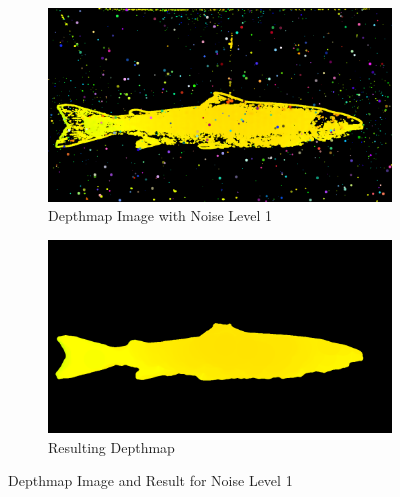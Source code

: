 \begin{figure}[H]
    \centering
    \begin{subfigure}{0.5\textwidth}
        \centering
        \includegraphics[width=.95\linewidth]{images/results/noise/noise63_1}
        \caption{Depthmap Image with Noise Level 1} 
        \label{fig:image_noise_level_1}
    \end{subfigure}%
    \begin{subfigure}{0.5\textwidth}
        \centering
        \includegraphics[width=.95\linewidth]{images/results/noise/filternoise63_1}
        \caption{Resulting Depthmap} 
        \label{fig:filter_noise_level_1}
    \end{subfigure}
    \caption{Depthmap Image and Result for Noise Level 1}
    \label{fig:noise_level_1}
\end{figure}

